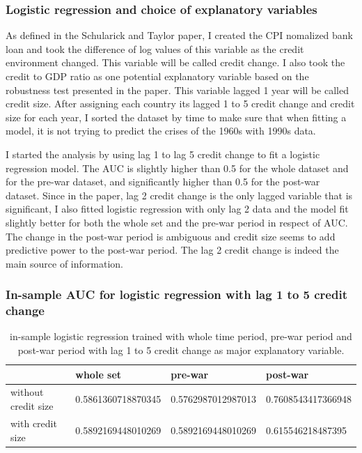\documentclass{article}
\begin{document}
\subsubsection*{Logistic regression and choice of explanatory variables}

As defined in the Schularick and Taylor paper, I created the CPI nomalized bank
loan and took the difference of log values of this variable as the credit environment changed. This variable will be called credit change. I also
took the credit to GDP ratio as one potential
explanatory variable based on the robustness test presented in the paper. This variable
lagged 1 year will be called credit size. After
assigning each country its lagged 1 to 5 credit change and credit size for each year, I
sorted the dataset by time to make sure that when fitting a model, it is
not trying to predict the crises of the 1960s with 1990s data.

I started the analysis by using lag 1 to lag 5 credit change to fit a
logistic regression model. The AUC is slightly higher than 0.5 for the whole
dataset and for the pre-war dataset, and significantly higher than 0.5
for the post-war dataset. Since in the paper, lag 2 credit change is the only
lagged variable that
is significant, I also fitted logistic regression with only lag 2 data
and the model fit slightly better for both the whole set and the pre-war period
in respect of AUC. The change in the post-war period is ambiguous and 
credit size seems to add predictive power to the post-war period. The lag 2 credit
change is indeed the
main source of information.

\subsubsection*{\centering{}In-sample AUC for logistic regression with lag 1 to 5 credit change}

\begin{table}[H]
    \begin{center}\begin{tabular}{|l|l|l|l|}
    \hline
                        & whole set          & pre-war            & post-war           \\ \hline
    without credit size & 0.5861360718870345 & 0.5762987012987013 & 0.7608543417366948 \\ \hline
    with credit size    & 0.5892169448010269 & 0.5892169448010269 & 0.615546218487395 \\ \hline
    \end{tabular}\end{center}
    \caption{in-sample logistic regression trained with whole time period,
    pre-war period and post-war period with lag 1 to 5 credit change as major
    explanatory variable.}
\end{table}
\end{document}
